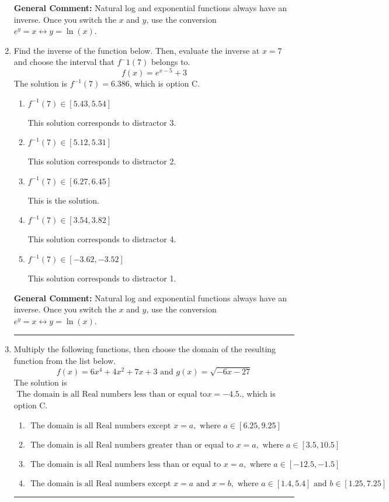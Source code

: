 \documentclass{extbook}[14pt]
\newcommand{\litem}[1]{\item #1

\rule{\textwidth}{0.4pt}}
\begin{document}
\begin{enumerate}
{\textbf{General Comment:} Natural log and exponential functions always have an inverse. Once you switch the $x$ and $y$, use the conversion $ e^y = x \leftrightarrow y=\ln(x)$.
}
\litem{
Find the inverse of the function below. Then, evaluate the inverse at $x = 7$ and choose the interval that $f^-1(7)$ belongs to.
\[ f(x) = e^{x-5}+3 \]The solution is \( f^{-1}(7) = 6.386 \), which is option C.\begin{enumerate}[label=\Alph*.]
\item \( f^{-1}(7) \in [5.43, 5.54] \)

 This solution corresponds to distractor 3.
\item \( f^{-1}(7) \in [5.12, 5.31] \)

 This solution corresponds to distractor 2.
\item \( f^{-1}(7) \in [6.27, 6.45] \)

 This is the solution.
\item \( f^{-1}(7) \in [3.54, 3.82] \)

 This solution corresponds to distractor 4.
\item \( f^{-1}(7) \in [-3.62, -3.52] \)

 This solution corresponds to distractor 1.
\end{enumerate}

\textbf{General Comment:} Natural log and exponential functions always have an inverse. Once you switch the $x$ and $y$, use the conversion $ e^y = x \leftrightarrow y=\ln(x)$.
}
\litem{
Multiply the following functions, then choose the domain of the resulting function from the list below.
\[ f(x) = 6x^{4} +4 x^{2} +7 x + 3 \text{ and } g(x) = \sqrt{-6x-27}  \]The solution is \( \text{ The domain is all Real numbers less than or equal to} x = -4.5. \), which is option C.\begin{enumerate}[label=\Alph*.]
\item \( \text{ The domain is all Real numbers except } x = a, \text{ where } a \in [6.25, 9.25] \)


\item \( \text{ The domain is all Real numbers greater than or equal to } x = a, \text{ where } a \in [3.5, 10.5] \)


\item \( \text{ The domain is all Real numbers less than or equal to } x = a, \text{ where } a \in [-12.5, -1.5] \)


\item \( \text{ The domain is all Real numbers except } x = a \text{ and } x = b, \text{ where } a \in [1.4, 5.4] \text{ and } b \in [1.25, 7.25] \)



\end{enumerate}}
\end{enumerate}
\end{document}
